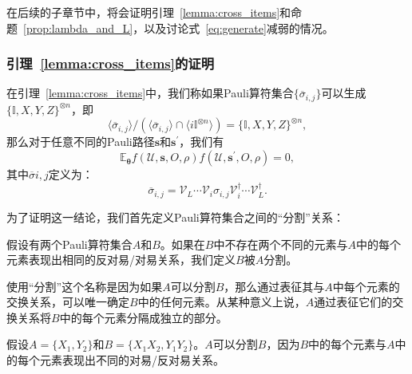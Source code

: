 在后续的子章节中，将会证明引理~\ref{lemma:cross_items}和命题~\ref{prop:lambda_and_L}，以及讨论式~\eqref{eq:generate}减弱的情况。

\subsubsection{引理~\ref{lemma:cross_items}的证明}\label{temp:subsubsection:cross_items}

在引理~\ref{lemma:cross_items}中，我们称如果Pauli算符集合$\{\overline{\sigma}_{i,j}\}$可以生成$\{\mathbb{I},X,Y,Z\}^{\otimes n}$，即
\begin{equation}\label{ap:eq:generate} 
    \langle {\overline{\sigma}_{i,j}}\rangle/\left(\langle {\overline{\sigma}_{i,j}}\rangle\cap\langle i\mathbb{I}^{\otimes n}\rangle\right)=\{\mathbb{I},X,Y,Z\}^{\otimes n}, 
\end{equation} 
那么对于任意不同的Pauli路径$\bm{s}$和$\bm{s^{\prime}}$，我们有 
\begin{equation} 
    \mathbb{E}_{\bm{\theta}}f(\mathcal{U},\bm{s},O,\rho)f(\mathcal{U},\bm{s^{\prime}},O,\rho)=0, 
\end{equation} 
其中$\overline{\sigma}{i,j}$定义为： 
\begin{equation}\label{ap:eq:effected_Pauli} 
    \overline{\sigma}_{i,j}= \mathcal{V}_{L} \cdots \mathcal{V}_{i} \sigma_{i,j} \mathcal{V}_{i}^\dagger\cdots \mathcal{V}_{L}^\dagger. 
\end{equation}

为了证明这一结论，我们首先定义Pauli算符集合之间的“分割”关系： 

\begin{definition} 
    假设有两个Pauli算符集合$A$和$B$。如果在$B$中不存在两个不同的元素与$A$中的每个元素表现出相同的反对易/对易关系，我们定义$B$被$A$分割。 
\end{definition} 
\begin{remark} 使用“分割”这个名称是因为如果$A$可以分割$B$，那么通过表征其与$A$中每个元素的交换关系，可以唯一确定$B$中的任何元素。从某种意义上说，$A$通过表征它们的交换关系将$B$中的每个元素分隔成独立的部分。
\end{remark}
\begin{example}
    假设$A=\{X_1,Y_2\}$和$B=\{X_1X_2,Y_1Y_2\}$。$A$可以分割$B$，因为$B$中的每个元素与$A$中的每个元素表现出不同的对易/反对易关系。
\end{example}

